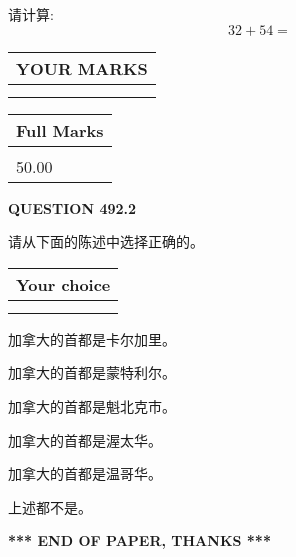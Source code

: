 \documentclass{ctexart}
\begin{document}
  
 
请计算:
\begin{equation}
32 +  %
54 = \nonumber
\end{equation}
 

 

 
  
\vspace{0.2in}
  
\noindent\begin{tabular}{|l|}
\hline
 YOUR MARKS  \\
\hline
 \\ 
 \\ 
\hline
\end{tabular}
\hspace{0.05in} \begin{tabular}{|l|}
\hline
 Full Marks  \\
\hline
 \\ 
50.00 \\
\hline
\end{tabular}
{\textbf{\Large{QUESTION
492.2 
}}}
  
  
请从下面的陈述中选择正确的。
  
  
\noindent\hspace{3.0in} \begin{tabular}{|l|}
\hline
Your choice \\
\hline
 \\ 
 \\ 
\hline
\end{tabular}
  
  
 
 
加拿大的首都是卡尔加里。
 
 
加拿大的首都是蒙特利尔。
 
 
加拿大的首都是魁北克市。
 
 
加拿大的首都是渥太华。
 
 
加拿大的首都是温哥华。
 
 
 上述都不是。
 
 
   
   
 \vspace{0.2in}
 
   
   
   
   
\vspace{1.0in} 
{\textbf{\large{ *** END OF PAPER, THANKS *** }}} 
   
\end{document}
